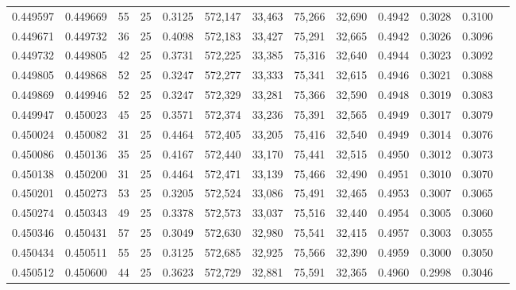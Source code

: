 \begin{tabular}{rrrrrrrrrrrrr}
0.449597 & 0.449669 &    55 &  25 &                                     0.3125 & 572,147 &  33,463 &  75,266 &  32,690 & 0.4942 & 0.3028 & 0.3100 \\
0.449671 & 0.449732 &    36 &  25 &                                     0.4098 & 572,183 &  33,427 &  75,291 &  32,665 & 0.4942 & 0.3026 & 0.3096 \\
0.449732 & 0.449805 &    42 &  25 &                                     0.3731 & 572,225 &  33,385 &  75,316 &  32,640 & 0.4944 & 0.3023 & 0.3092 \\
0.449805 & 0.449868 &    52 &  25 &                                     0.3247 & 572,277 &  33,333 &  75,341 &  32,615 & 0.4946 & 0.3021 & 0.3088 \\
0.449869 & 0.449946 &    52 &  25 &                                     0.3247 & 572,329 &  33,281 &  75,366 &  32,590 & 0.4948 & 0.3019 & 0.3083 \\
0.449947 & 0.450023 &    45 &  25 &                                     0.3571 & 572,374 &  33,236 &  75,391 &  32,565 & 0.4949 & 0.3017 & 0.3079 \\
0.450024 & 0.450082 &    31 &  25 &                                     0.4464 & 572,405 &  33,205 &  75,416 &  32,540 & 0.4949 & 0.3014 & 0.3076 \\
0.450086 & 0.450136 &    35 &  25 &                                     0.4167 & 572,440 &  33,170 &  75,441 &  32,515 & 0.4950 & 0.3012 & 0.3073 \\
0.450138 & 0.450200 &    31 &  25 &                                     0.4464 & 572,471 &  33,139 &  75,466 &  32,490 & 0.4951 & 0.3010 & 0.3070 \\
0.450201 & 0.450273 &    53 &  25 &                                     0.3205 & 572,524 &  33,086 &  75,491 &  32,465 & 0.4953 & 0.3007 & 0.3065 \\
0.450274 & 0.450343 &    49 &  25 &                                     0.3378 & 572,573 &  33,037 &  75,516 &  32,440 & 0.4954 & 0.3005 & 0.3060 \\
0.450346 & 0.450431 &    57 &  25 &                                     0.3049 & 572,630 &  32,980 &  75,541 &  32,415 & 0.4957 & 0.3003 & 0.3055 \\
0.450434 & 0.450511 &    55 &  25 &                                     0.3125 & 572,685 &  32,925 &  75,566 &  32,390 & 0.4959 & 0.3000 & 0.3050 \\
0.450512 & 0.450600 &    44 &  25 &                                     0.3623 & 572,729 &  32,881 &  75,591 &  32,365 & 0.4960 & 0.2998 & 0.3046 \\

\end{tabular}
